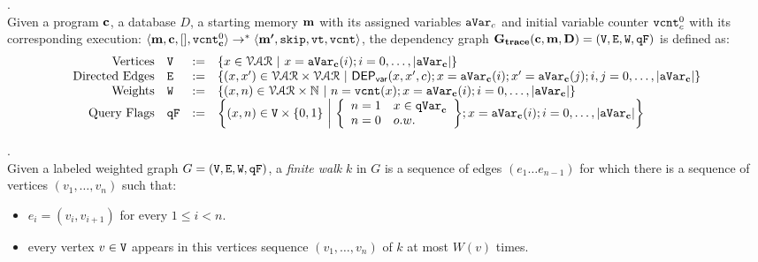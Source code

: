 {{\begin{defn}
\[\] 
%
%
\end{defn}
%
%
\begin{defn}.
\\
Given a program ${\boldsymbol{\mathbf{c}}}$, a database $D$, a starting memory ${\boldsymbol{\mathbf{m}}}$ with its assigned variables $\mathtt{aVar}_c$ and initial variable counter $\mathtt{vcnt}^0_{c}$ with its corresponding execution:
$\langle {\boldsymbol{\mathbf{m}}}, {\boldsymbol{\mathbf{c}}}, [], \mathtt{vcnt}^0_{{\boldsymbol{\mathbf{c}}}} \rangle 
\to^{*}
\langle {\boldsymbol{\mathbf{m'}}}, \mathtt{skip}, \mathtt{vt}, \mathtt{vcnt} \rangle$,
the dependency graph $\bf{G_{trace}}({\boldsymbol{\mathbf{c}}}, {\boldsymbol{\mathbf{m}}}, D) = (\mathtt{V}, \mathtt{E}, \mathtt{W}, \mathtt{qF})$ is defined as:
%
\[
\begin{array}{rlcl}
  \text{Vertices} &
  \vertxs & := & \left\{ 
  x \in \mathcal{VAR}
  ~ \middle\vert ~
  x = \avar_{\ssa{c}}(i); i = 0, \ldots, |\avar_{\ssa{c}}| 
  \right\}
  \\
  \text{Directed Edges} &
  \edges & := & 
  \left\{ 
  (x, x') \in \mathcal{VAR} \times \mathcal{VAR}
  ~ \middle\vert ~
  \vardep(x, x', c); 
  x = \avar_{\ssa{c}}(i); x' = \avar_{\ssa{c}}(j); i,j = 0, \ldots, |\avar_{\ssa{c}}| 
  \right\}
  \\
  \text{Weights} &
  \weights & := & 
  \left\{ 
  (x, n) \in \mathcal{VAR} \times \mathbb{N}
  ~ \middle\vert ~
  n = \vcounter(x); x = \avar_{\ssa{c}}(i); i = 0, \ldots, |\avar_{\ssa{c}}|
  \right\}
  \\
  \text{Query Flags} &
  \qflag & := & 
  \left\{(x, n)  \in \vertxs \times \{0, 1\} 
  ~ \middle\vert ~
  \left\{
  \begin{array}{ll}
  n = 1 & x \in \qvar_{\ssa{c}} \\ 
  n = 0 & o.w.
  \end{array}
  \right\};
  x = \avar_{\ssa{c}}(i); i = 0, \ldots, |\avar_{\ssa{c}}|
  \right\}
\end{array}
\]
\end{defn}
%
%
\begin{defn}.
\label{def:finitewalk}
\\
Given a labeled weighted graph $G = (\mathtt{V}, \mathtt{E}, \mathtt{W}, \mathtt{qF})$, a \emph{finite walk} $k$ in $G$ is a sequence of edges $(e_1 \ldots e_{n - 1})$ 
for which there is a sequence of vertices $(v_1, \ldots, v_{n})$ such that:
\begin{itemize}
    \item $e_i = (v_{i},v_{i + 1})$ for every $1 \leq i < n$.
    \item every vertex $v \in \mathtt{V}$ appears in this vertices sequence $(v_1, \ldots, v_{n})$ of $k$ at most $W(v)$ times.  

\end{itemize}
\end{defn}}}
